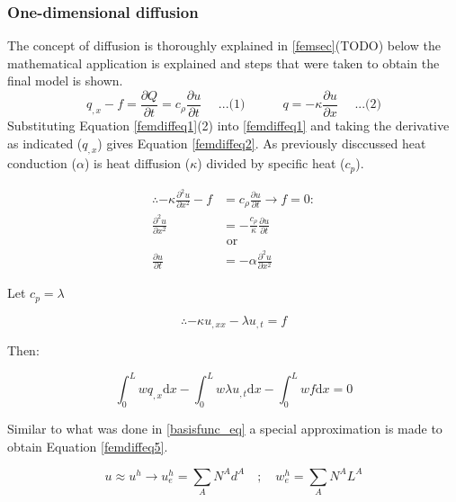 	\subsubsection{One-dimensional diffusion}
The concept of diffusion is thoroughly explained in \ref{femsec}(TODO) below the mathematical application is explained and steps that were taken to obtain the final model is shown.
	\begin{equation}\label{femdiffeq1}
	q_{,x} - f = \frac{\partial Q}{\partial t} = c_{\rho}\frac{\partial u}{\partial t}\quad\text{  ...(1)} \quad\quad\quad q = -\kappa \frac{\partial u}{\partial x}\quad\text{  ...(2)}
\end{equation}
Substituting Equation \ref{femdiffeq1}(2) into \ref{femdiffeq1} and taking the derivative as indicated ($q_{,x}$) gives Equation \ref{femdiffeq2}. 
As previously disccussed heat conduction ($\alpha$) is heat diffusion ($\kappa$)  divided by specific heat ($c_p$).


\begin{equation}\label{femdiffeq2}
\begin{aligned}
\therefore -\kappa \frac{\partial^2 u}{\partial x^2} - f &= c_{\rho}\frac{\partial u}{\partial t} \rightarrow f=0:\\
\frac{\partial^2 u}{\partial x^2} &= - \frac{c_{\rho}}{\kappa} \frac{\partial u}{\partial t} \quad \\
&\text{ or } \\
\frac{\partial u}{\partial t} &= -\alpha \frac{\partial^2 u}{\partial x^2}
\end{aligned}
\end{equation}


Let $c_p = \lambda$ 

\begin{equation}\label{femdiffeq3}
\therefore -\kappa u_{,xx} - \lambda u_{,t} = f
\end{equation}


Then:

\begin{equation}\label{femdiffeq4}
\int_0^L w q_{,x} \text{d}x - \int_0^L w \lambda u_{,t} \text{d}x - \int_0^L w f \text{d}x = 0
\end{equation}


Similar to what was done in \ref{basisfunc_eq} a special approximation is made to obtain Equation \ref{femdiffeq5}.

\begin{equation}\label{femdiffeq5}
u \approx u^h \rightarrow u_e^h = \sum_{A}N^A d^A \quad;\quad w_e^h = \sum_{A}N^A L^A
\end{equation}


